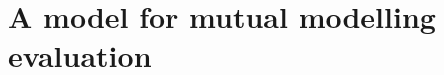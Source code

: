 \documentclass[twocolumn]{article}
\newcommand{\eg}{{\textit{e.g.\ }}}
\begin{document}
%
%
%
%
\section{A model for mutual modelling evaluation}
\end{document}
